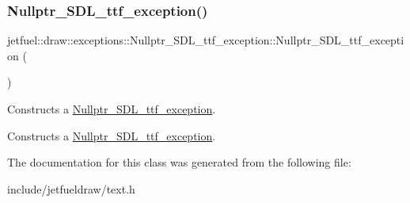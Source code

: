 \subsubsection{\texorpdfstring{Nullptr\+\_\+\+S\+D\+L\+\_\+ttf\+\_\+exception()}{Nullptr\_SDL\_ttf\_exception()}}
{\footnotesize\ttfamily jetfuel\+::draw\+::exceptions\+::\+Nullptr\+\_\+\+S\+D\+L\+\_\+ttf\+\_\+exception\+::\+Nullptr\+\_\+\+S\+D\+L\+\_\+ttf\+\_\+exception (\begin{DoxyParamCaption}{ }\end{DoxyParamCaption})\hspace{0.3cm}{\ttfamily [inline]}}



Constructs a \hyperlink{classjetfuel_1_1draw_1_1exceptions_1_1Nullptr__SDL__ttf__exception}{Nullptr\+\_\+\+S\+D\+L\+\_\+ttf\+\_\+exception}. 

Constructs a \hyperlink{classjetfuel_1_1draw_1_1exceptions_1_1Nullptr__SDL__ttf__exception}{Nullptr\+\_\+\+S\+D\+L\+\_\+ttf\+\_\+exception}. 

The documentation for this class was generated from the following file\+:\begin{DoxyCompactItemize}
\item 
include/jetfueldraw/text.\+h\end{DoxyCompactItemize}
